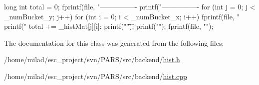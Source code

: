 \begin{DoxyCode}
                                             {
        long int total = 0;
        fprintf(file, "----------------%
        printf("----------------%
        for (int j = 0; j < _numBucket_y; j++) {
                for (int i = 0; i < _numBucket_x; i++) {
                        fprintf(file, "%
                        printf("%
                        total += _histMat[j][i];
                }
                printf("\t");
        }
        printf("\n");
        fprintf(file, "\n");
}
\end{DoxyCode}


The documentation for this class was generated from the following files:\begin{DoxyCompactItemize}
\item 
/home/milad/esc\_\-project/svn/PARS/src/backend/\hyperlink{hist_8h}{hist.h}\item 
/home/milad/esc\_\-project/svn/PARS/src/backend/\hyperlink{hist_8cpp}{hist.cpp}\end{DoxyCompactItemize}

